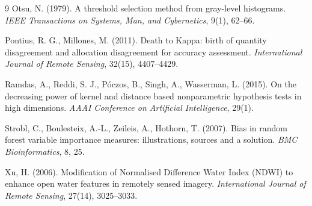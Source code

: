 \documentclass[11pt,a4paper,oneside]{book}
\begin{document}
\begin{thebibliography}{9}
Otsu, N. (1979). A threshold selection method from gray-level histograms.
\emph{IEEE Transactions on Systems, Man, and Cybernetics}, 9(1), 62--66.

Pontius, R. G., Millones, M. (2011). Death to Kappa: birth of quantity
disagreement and allocation disagreement for accuracy assessment.
\emph{International Journal of Remote Sensing}, 32(15), 4407--4429.

Ramdas, A., Reddi, S. J., Póczos, B., Singh, A., Wasserman, L. (2015). On the
decreasing power of kernel and distance based nonparametric hypothesis tests in
high dimensions. \emph{AAAI Conference on Artificial Intelligence}, 29(1).

Strobl, C., Boulesteix, A.-L., Zeileis, A., Hothorn, T. (2007). Bias in random
forest variable importance measures: illustrations, sources and a solution.
\emph{BMC Bioinformatics}, 8, 25.

Xu, H. (2006). Modification of Normalised Difference Water Index (NDWI) to
enhance open water features in remotely sensed imagery. \emph{International
Journal of Remote Sensing}, 27(14), 3025--3033.

\end{thebibliography}

\appendix



\end{document}
